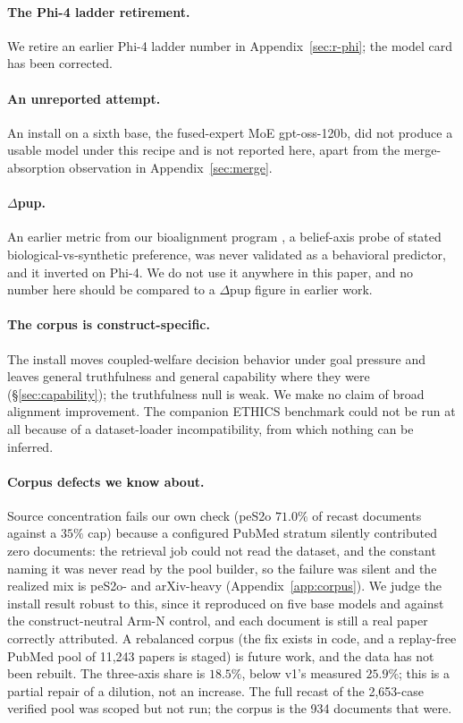 \documentclass[11pt]{article}
\newcommand{\cw}{coupled-welfare}
\begin{document}
\paragraph{The Phi-4 ladder retirement.} We retire an earlier Phi-4 ladder number in
Appendix~\ref{sec:r-phi}; the model card has been corrected.

\paragraph{An unreported attempt.} An install on a sixth base, the fused-expert MoE gpt-oss-120b,
did not produce a usable model under this recipe and is not reported here, apart from the
merge-absorption observation in Appendix~\ref{sec:merge}.

\paragraph{$\Delta$pup.} An earlier metric from our bioalignment program
\citep{northen2026bioalignment}, a belief-axis probe of stated biological-vs-synthetic preference,
was never validated as a behavioral predictor, and it inverted on Phi-4. We do not use it anywhere
in this paper, and no number here should be compared to a $\Delta$pup figure in earlier work.

\paragraph{The corpus is construct-specific.} The install moves \cw{} decision behavior under
goal pressure and leaves general truthfulness and general capability where they were
(\S\ref{sec:capability}); the truthfulness null is weak. We make no claim of broad alignment
improvement. The companion ETHICS benchmark could not be run at all because of a
dataset-loader incompatibility, from which nothing can be inferred.

\paragraph{Corpus defects we know about.} Source concentration fails our own check (peS2o $71.0\%$ of
recast documents against a $35\%$ cap) because a configured PubMed stratum silently contributed zero
documents: the retrieval job could not read the dataset, and the constant naming it was never read
by the pool builder, so the failure was silent and the realized mix is peS2o- and arXiv-heavy
(Appendix~\ref{app:corpus}). We judge the install result robust to this, since it
reproduced on five base models and against the construct-neutral Arm-N control, and each document is
still a real paper correctly attributed. A rebalanced corpus (the fix exists in code, and a
replay-free PubMed pool of 11{,}243 papers is staged) is future work, and the data has not been
rebuilt. The three-axis share is $18.5\%$, below v1's measured $25.9\%$; this is a partial repair of
a dilution, not an increase. The full recast of the 2{,}653-case verified pool was scoped but not
run; the corpus is the 934 documents that were.
\end{document}
